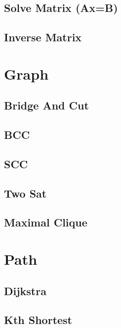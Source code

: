 \documentclass[10pt,twocolumn,oneside]{article}
\begin{document}
    \subsection{Solve Matrix (Ax=B)}
    \subsection{Inverse Matrix}
    
    \newpage


    \section{Graph}
    \subsection{Bridge And Cut}
    
    \subsection{BCC}
    
    \subsection{SCC}
    
    \subsection{Two Sat}
    
    \subsection{Maximal Clique}
    
    \newpage

    \section{Path}
    \subsection{Dijkstra}
    \subsection{Kth Shortest}
    
    \newpage
\end{document}

